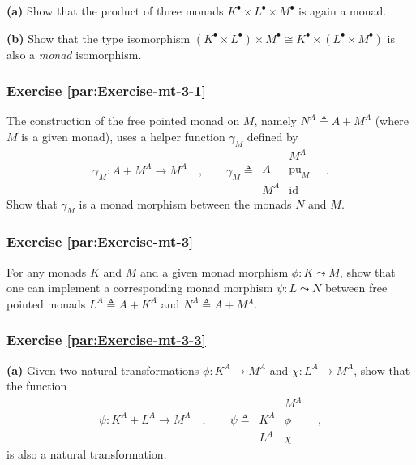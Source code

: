 \textbf{(a)} Show that the product of three monads $K^{\bullet}\times L^{\bullet}\times M^{\bullet}$
is again a monad.

\textbf{(b)} Show that the type isomorphism $(K^{\bullet}\times L^{\bullet})\times M^{\bullet}\cong K^{\bullet}\times(L^{\bullet}\times M^{\bullet})$
is also a \emph{monad} isomorphism.

\subsubsection{Exercise \label{par:Exercise-mt-3-1}\ref{par:Exercise-mt-3-1}}

The construction of the free pointed monad on $M$, namely $N^{A}\triangleq A+M^{A}$
(where $M$ is a given monad), uses a helper function $\gamma_{M}$
defined by
\[
\gamma_{M}:A+M^{A}\rightarrow M^{A}\quad,\quad\quad\gamma_{M}\triangleq\,\begin{array}{|c||c|}
 & M^{A}\\
\hline A & \text{pu}_{M}\\
M^{A} & \text{id}
\end{array}\quad.
\]
Show that $\gamma_{M}$ is a monad morphism between the monads $N$
and $M$.

\subsubsection{Exercise \label{par:Exercise-mt-3}\ref{par:Exercise-mt-3}}

For any monads $K$ and $M$ and a given monad morphism $\phi:K\leadsto M$,
show that one can implement a corresponding monad morphism $\psi:L\leadsto N$
between free pointed monads $L^{A}\triangleq A+K^{A}$ and $N^{A}\triangleq A+M{}^{A}$.

\subsubsection{Exercise \label{par:Exercise-mt-3-3}\ref{par:Exercise-mt-3-3}}

\textbf{(a)} Given two natural transformations $\phi:K^{A}\rightarrow M^{A}$
and $\chi:L^{A}\rightarrow M^{A}$, show that the function 
\[
\psi:K^{A}+L^{A}\rightarrow M^{A}\quad,\quad\quad\psi\triangleq\,\begin{array}{|c||c|}
 & M^{A}\\
\hline K^{A} & \phi\\
L^{A} & \chi
\end{array}\quad,
\]
 is also a natural transformation.

